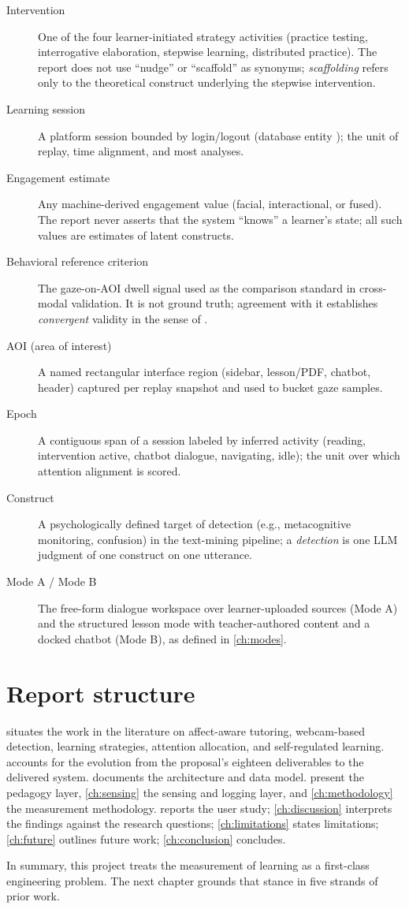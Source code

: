 \begin{description}
  \item[Intervention] One of the four learner-initiated strategy
  activities (practice testing, interrogative elaboration, stepwise
  learning, distributed practice). The report does not use ``nudge'' or
  ``scaffold'' as synonyms; \emph{scaffolding} refers only to the
  theoretical construct underlying the stepwise intervention.
  \item[Learning session] A platform session bounded by login/logout
  (database entity ); the unit of replay,
  time alignment, and most analyses.
  \item[Engagement estimate] Any machine-derived engagement value
  (facial, interactional, or fused). The report never asserts that the
  system ``knows'' a learner's state; all such values are estimates of
  latent constructs.
  \item[Behavioral reference criterion] The gaze-on-AOI dwell signal used
  as the comparison standard in cross-modal validation. It is not ground
  truth; agreement with it establishes \emph{convergent} validity in the
  sense of \citet{campbell1959}.
  \item[AOI (area of interest)] A named rectangular interface region
  (sidebar, lesson/PDF, chatbot, header) captured per replay snapshot and
  used to bucket gaze samples.
  \item[Epoch] A contiguous span of a session labeled by inferred
  activity (reading, intervention active, chatbot dialogue, navigating,
  idle); the unit over which attention alignment is scored.
  \item[Construct] A psychologically defined target of detection (e.g.,
  metacognitive monitoring, confusion) in the text-mining pipeline; a
  \emph{detection} is one LLM judgment of one construct on one utterance.
  \item[Mode A / Mode B] The free-form dialogue workspace over
  learner-uploaded sources (Mode A) and the structured lesson mode with
  teacher-authored content and a docked chatbot (Mode B), as defined in
  \cref{ch:modes}.
\end{description}

\section{Report structure}
\label{sec:intro-structure}

 situates the work in the literature on affect-aware
tutoring, webcam-based detection, learning strategies, attention
allocation, and self-regulated learning.  accounts for the
evolution from the proposal's eighteen deliverables to the delivered
system.  documents the architecture and data model.
 present the pedagogy layer,
\cref{ch:sensing} the sensing and logging layer, and \cref{ch:methodology}
the measurement methodology.  reports the user study;
\cref{ch:discussion} interprets the findings against the research
questions; \cref{ch:limitations} states limitations;
\cref{ch:future} outlines future work; \cref{ch:conclusion} concludes.

\medskip
\noindent In summary, this project treats the measurement of learning as a
first-class engineering problem. The next chapter grounds that stance in
five strands of prior work.
